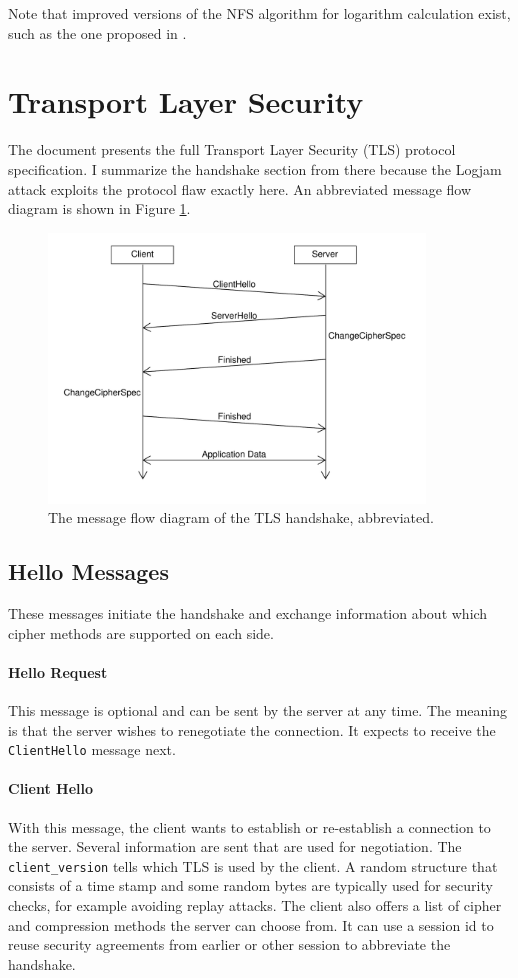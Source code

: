 \documentclass[paper=a4, fontsize=11pt]{scrartcl} %
\numberwithin{equation}{section} %
\numberwithin{figure}{section} %
\numberwithin{table}{section} %
\begin{document}
Note that improved versions of the NFS algorithm for logarithm calculation exist, such as the one proposed in \citep{joux2003improvements}.
\section{Transport Layer Security}
\label{sec:tls}
The document \citep{dierks2008transport} presents the full Transport Layer Security (TLS) protocol specification. I summarize the handshake section from there because the Logjam attack exploits the protocol flaw exactly here. An abbreviated message flow diagram is shown in Figure \ref{fig:tls}.
\begin{figure}[h]
	\centering
	\includegraphics[width=10cm]{../Grafiken/TLS/tls}
	\caption{The message flow diagram of the TLS handshake, abbreviated.}
	\label{fig:tls}
\end{figure}
\subsection{Hello Messages}
These messages initiate the handshake and exchange information about which cipher methods are supported on each side.
\paragraph{Hello Request} This message is optional and can be sent by the server at any time. The meaning is that the server wishes to renegotiate the connection. It expects to receive the \verb|ClientHello| message next.
\paragraph{Client Hello} With this message, the client wants to establish or re-establish a connection to the server. Several information are sent that are used for negotiation. The \verb|client_version| tells which TLS is used by the client. A random structure that consists of a time stamp and some random bytes are typically used for security checks, for example avoiding replay attacks. The client also offers a list of cipher and compression methods the server can choose from. It can use a session id to reuse security agreements from earlier or other session to abbreviate the handshake.
\end{document}
